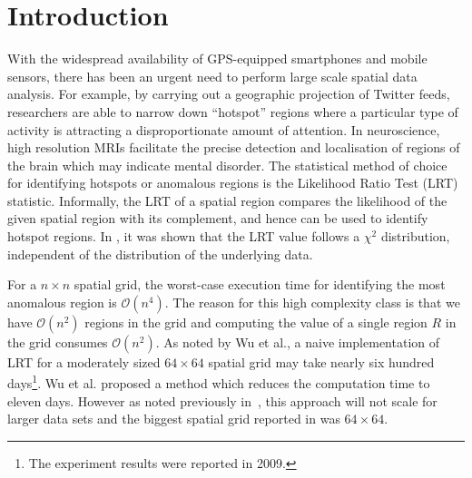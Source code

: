 \documentclass[AMA,LATO1COL]{WileyNJD-v2}
\newcommand\bigo{\mathcal O}
\begin{document}


\maketitle

\section{Introduction}\label{sec1}
With the widespread availability of GPS-equipped smartphones and mobile
sensors, there has been an urgent need to perform large scale spatial data analysis.
For example, by carrying out a geographic projection of Twitter feeds, researchers are able to
narrow down ``hotspot'' regions where a particular type of activity is attracting a disproportionate  amount of attention. In neuroscience, high resolution MRIs facilitate the precise detection and localisation of regions of the brain which may indicate mental disorder.
The statistical method of choice for identifying hotspots or anomalous regions
is the Likelihood Ratio Test (LRT) statistic.
Informally, the LRT of a spatial region compares the likelihood of the given spatial region with its complement, and hence can be used to identify hotspot regions. In \cite{chisquare}, it was shown that the LRT value follows a $\chi^{2}$ distribution, independent of the distribution of the underlying data.

\noindent For a $n\times n$ spatial grid, the worst-case execution time for identifying the most
anomalous region is $\bigo(n^4)$. The reason for this high complexity class is that we have $\bigo(n^2)$ regions in the grid and computing the value of a single region $R$ in the grid consumes $\bigo(n^2)$. As noted by Wu et al.\cite{jour}, a naive implementation of LRT for a moderately sized $64 \times 64$  spatial grid may take nearly six hundred days\footnote{The experiment results were  reported in  2009.}. Wu et al.\cite{jour} proposed a method which reduces the computation time to eleven days. However as noted previously in~\cite{ADMA}, this approach will not scale for larger data sets and the biggest spatial grid reported in\cite{jour} was $64 \times  64$.
\end{document}
